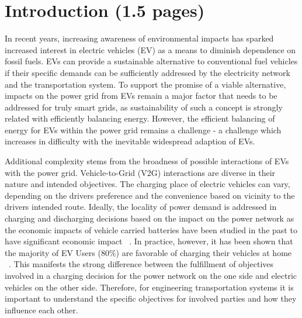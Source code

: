 \section{Introduction (1.5 pages)}

In recent years, increasing awareness of environmental impacts has sparked increased interest in electric vehicles (EV) as a means to diminish dependence on fossil fuels. EVs can provide a sustainable alternative to conventional fuel vehicles if their specific demands can be sufficiently addressed by the electricity network and the transportation system.
To support the promise of a viable alternative, impacts on the power grid from EVs remain a major factor that needs to be addressed for truly smart grids, as sustainability of such a concept is strongly related with efficiently balancing energy. 
However, the efficient balancing of energy for EVs within the power grid remains a challenge - a challenge which increases in difficulty with the inevitable widespread adaption of EVs.

Additional complexity stems from the broadness of possible interactions of EVs with the power grid. Vehicle-to-Grid (V2G) interactions are diverse in their nature and intended objectives. 
The charging place of electric vehicles can vary, depending on the drivers preference and the convenience based on vicinity to the drivers intended route. Ideally, the locality of power demand is addressed in charging and discharging decisions based on the impact on the power network as the economic impacts of vehicle carried batteries have been studied in the past to have significant economic impact ~\cite{peterson2010economics,erdinc2014economic}. In practice, however, it has been shown that the majority of EV Users (80\%) are favorable of charging their vehicles at home ~\cite{haines2009simulation}. This manifests the strong difference between the fulfillment of objectives involved in a charging decision for the power network on the one side and electric vehicles on the other side. Therefore, for engineering transportation systems it is important to understand the specific objectives for involved parties and how they influence each other. 

